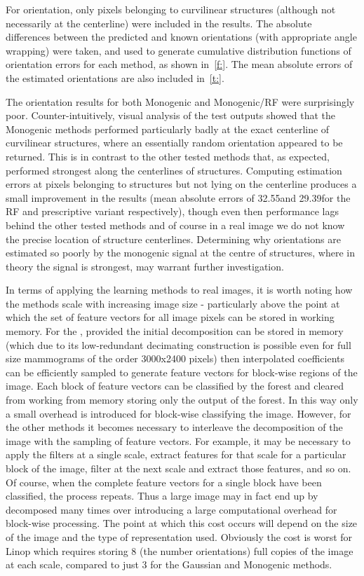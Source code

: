 For orientation, only pixels belonging to curvilinear structures (although not necessarily at the centerline) were included in the results. The absolute differences between the predicted and known orientations (with appropriate angle wrapping) were taken, and used to generate cumulative distribution functions of orientation errors for each method, as shown in~\ref{f:}. The mean absolute errors of the estimated orientations are also included in~\ref{t:}.

The orientation results for both Monogenic and Monogenic/RF were surprisingly poor. Counter-intuitively, visual analysis of the test outputs showed that the Monogenic methods performed particularly badly at the exact centerline of curvilinear structures, where an essentially random orientation appeared to be returned. This is in contrast to the other tested methods that, as expected, performed strongest along the centerlines of structures. Computing estimation errors at pixels belonging to structures but not lying on the centerline produces a small improvement in the results (mean absolute errors of 32.55\deg and 29.39\deg for the RF and prescriptive variant respectively), though even then performance lags behind the other tested methods and of course in a real image we do not know the precise location of structure centerlines. Determining why orientations are estimated so poorly by the monogenic signal at the centre of structures, where in theory the signal is strongest, may warrant further investigation.




In terms of applying the learning methods to real images, it is worth noting how the methods scale with increasing image size - particularly above the point at which the set of feature vectors for all image pixels can be stored in working memory. For the \dtcwt, provided the initial decomposition can be stored in memory (which due to its low-redundant decimating construction is possible even for full size mammograms of the order 3000x2400 pixels) then interpolated coefficients can be efficiently sampled to generate feature vectors for block-wise regions of the image. Each block of feature vectors can be classified by the forest and cleared from working from memory storing only the output of the forest. In this way only a small overhead is introduced for block-wise classifying the image. However, for the other methods it becomes necessary to interleave the decomposition of the image with the sampling of feature vectors. For example, it may be necessary to apply the filters at a single scale, extract features for that scale for a particular block of the image, filter at the next scale and extract those features, and so on. Of course, when the complete feature vectors for a single block have been classified, the process repeats. Thus a large image may in fact end up by decomposed many times over introducing a large computational overhead for block-wise processing. The point at which this cost occurs will depend on the size of the image and the type of representation used. Obviously the cost is worst for Linop which requires storing 8 (\ie the number orientations) full copies of the image at each scale, compared to just 3 for the Gaussian and Monogenic methods.




